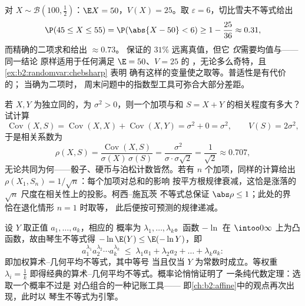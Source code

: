 \begin{example}[切比雪夫不等式用于一百次
抛掷]\label{ex:b2:randomvar:hundredtosses}
对 $X \sim \mathcal B(100, \frac12)$：$\E X = 50$，$V(X) =
25$。取 $\varepsilon = 6$，切比雪夫不等式给出
\[
\P(45 \leq X \leq 55) = \P(\abs{X - 50} < 6)
\geq 1 - \frac{25}{36} \approx 0.31 ,
\]
而精确的二项求和给出 $\approx 0.73$。
保证的 $31\%$ 远离真值，但它
\emph{仅}需要均值与——同一结论
原样适用于任何满足 $\E = 50$、$V = 25$ 的
，无论多么奇特，且 \cref{ex:b2:randomvar:chebsharp} 表明
确有这样的变量使之取等。普适性是有代价的；
当确为二项时，
周末问题中的指数型工具可弥合大部分差距。
\end{example}

\begin{example}\label{ex:b2:randomvar:partwhole}
若 $X, Y$ 为独立同的，为
$\sigma^2 > 0$，则一个加项与和
$S = X + Y$ 的相关程度有多大？试计算
\[
\operatorname{Cov}(X, S) = \operatorname{Cov}(X, X) +
\operatorname{Cov}(X, Y) = \sigma^2 + 0 = \sigma^2,
\qquad V(S) = 2\sigma^2,
\]
于是相关系数为
\[
\rho(X, S) = \frac{\operatorname{Cov}(X,
S)}{\sigma(X)\,\sigma(S)}
= \frac{\sigma^2}{\sigma\cdot\sigma\sqrt2}
= \frac{1}{\sqrt2} \approx 0.707 ,
\]
无论共同为何——骰子、硬币与泊松计数皆然。若有
$n$ 个加项，同样的计算给出 $\rho(X_1, S_n) =
1/\sqrt n$：每个加项对总和的影响
按平方根规律衰减，这恰是涨落的
$\sqrt n$ 尺度在相关性上的投影。柯西–施瓦茨
不等式总保证 $\abs\rho \leq 1$；此处的界
恰在退化情形 $n = 1$ 时取等，
此后便按可预测的规律递减。
\end{example}

\begin{example}\label{ex:b2:randomvar:amgm}
设 $Y$ 取正值 $a_1, \dots, a_k$，相应的
概率为 $\lambda_1, \dots, \lambda_k$。函数
$-\ln$ 在 $\intoo0\infty$ 上为凸函数，故由琴生不等式得
$-\ln\E(Y) \leq \E(-\ln Y)$，即
\[
a_1^{\lambda_1}a_2^{\lambda_2}\cdots a_k^{\lambda_k}
\;\leq\; \lambda_1a_1 + \lambda_2a_2 + \dots + \lambda_ka_k :
\]
即加权算术–几何平均不等式，其中等号
当且仅当 $Y$ 为常数时成立。等权重 $\lambda_i = \frac1k$
即得经典的算术–几何平均不等式。概率论悄悄证明了
一条纯代数定理：选取一个概率不过是
对凸组合的一种记账工具——
即\cref{ch:b2:affine}中的观点再次出现，此时以
琴生不等式为引擎。
\end{example}

